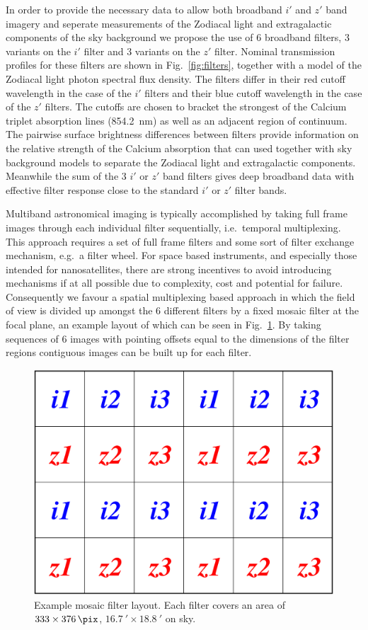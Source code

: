 \documentclass[]{iac}
\begin{document}
In order to provide the necessary data to allow both broadband $i'$ and $z'$ band imagery and seperate measurements of
the Zodiacal light and extragalactic components of the sky background we propose the use of 6 broadband filters, 3
variants on the $i'$ filter and 3 variants on the $z'$ filter. Nominal transmission profiles for these filters are shown
in Fig.~\ref{fig:filters}, together with a model of the Zodiacal light photon spectral flux density. The filters differ
in their red cutoff wavelength in the case of the $i'$ filters and their blue cutoff wavelength in the case of the $z'$
filters. The cutoffs are chosen to bracket the strongest of the Calcium triplet absorption lines
(\SI{854.2}{\nano\metre}) as well as an adjacent region of continuum. The pairwise surface brightness differences
between filters provide information on the relative strength of the Calcium absorption that can used together with sky
background models to separate the Zodiacal light and extragalactic components. Meanwhile the sum of the 3 $i'$ or $z'$
band filters gives deep broadband data with effective filter response close to the standard $i'$ or $z'$ filter bands.

Multiband astronomical imaging is typically accomplished by taking full frame images through each individual filter
sequentially, i.e.\ temporal multiplexing. This approach requires a set of full frame filters and some sort of filter
exchange mechanism, e.g.\ a filter wheel. For space based instruments, and especially those intended for nanosatellites,
there are strong incentives to avoid introducing mechanisms if at all possible due to complexity, cost and potential for
failure. Consequently we favour a spatial multiplexing based approach in which the field of view is divided up amongst
the 6 different filters by a fixed mosaic filter at the focal plane, an example layout of which can be seen in
Fig.~\ref{fig:mosaic}. By taking sequences of 6 images with pointing offsets equal to the dimensions of the filter
regions contiguous images can be built up for each filter.

\begin{figure}[htp]
  \center \includegraphics[width=0.7\columnwidth]{figures/mosaic.pdf}
  \caption{\label{fig:mosaic}Example mosaic filter layout. Each filter covers an area of $333 \times \SI{376}{\pix}$,
    $\SI{16.7}{\arcminute} \times \SI{18.8}{\arcminute}$ on sky.}
\end{figure}
\end{document}
